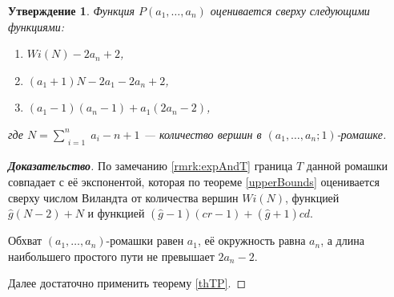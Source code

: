 \documentclass[12pt]{article}
\newtheorem{proposition}[theorem]{Утверждение}
\begin{document}
\begin{proposition}
\label{upperBoundsP}
Функция $P(a_1, \dots, a_n)$ оценивается сверху следующими функциями:
\begin{enumerate}
\item $Wi(N) - 2a_n + 2$,
\item $(a_1 + 1)N - 2a_1 - 2a_n + 2$,
\item $(a_1 - 1)(a_n - 1) + a_1(2a_n - 2)$,
\end{enumerate}
где $N = \sum\limits_{\substack{i=1}}^n a_i - n + 1$ --- количество вершин в $(a_1, \dots, a_n; 1)$-ромашке.
\end{proposition}
\begin{proof}[\textbf{Доказательство}]
По замечанию \ref{rmrk:expAndT} граница $T$ данной ромашки совпадает с её экспонентой, которая по теореме \ref{upperBounds} оценивается сверху числом Виландта от количества вершин $Wi(N)$, функцией $\hat{g}(N - 2) + N$ и функцией $(\hat{g} - 1)(cr - 1) + (\hat{g} + 1) cd$.

Обхват $(a_1, \dots, a_n)$-ромашки равен $a_1$, её окружность равна $a_n$, а длина наибольшего простого пути не превышает $2a_n - 2$.

Далее достаточно применить теорему \ref{thTP}.
\end{proof}
\end{document}
